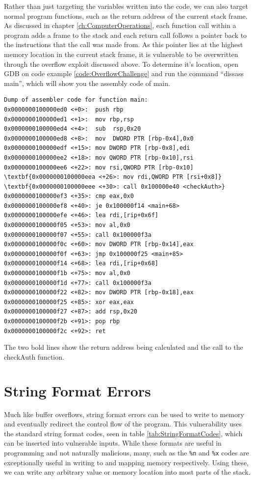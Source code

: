 \documentclass[a4paper,11pt]{report}
\begin{document}
			Rather than just targeting the variables written into the code, we can also target normal program functions,
			such as the return address of the current stack frame. 
			As discussed in chapter \ref{ch:ComputerOperations}, 
			each function call within a program adds a frame to the stack and each return call follows a pointer back to the instructions that the call was made from. 
			As this pointer lies at the highest memory location in the current stack frame, it is vulnerable to be overwritten through the overflow exploit discussed above. 
			To determine it's location, open GDB on code example \ref{code:OverflowChallenge} and run the command ``dissass main'', which will show you the assembly code of main. 
		\begin{Verbatim}[commandchars=\\\{\}]
Dump of assembler code for function main:
0x0000000100000ed0 <+0>:  push rbp
0x0000000100000ed1 <+1>:  mov rbp,rsp
0x0000000100000ed4 <+4>:  sub  rsp,0x20
0x0000000100000ed8 <+8>:  mov  DWORD PTR [rbp-0x4],0x0
0x0000000100000edf <+15>: mov DWORD PTR [rbp-0x8],edi
0x0000000100000ee2 <+18>: mov QWORD PTR [rbp-0x10],rsi
0x0000000100000ee6 <+22>: mov rsi,QWORD PTR [rbp-0x10]
\textbf{0x0000000100000eea <+26>: mov rdi,QWORD PTR [rsi+0x8]}
\textbf{0x0000000100000eee <+30>: call 0x100000e40 <checkAuth>}
0x0000000100000ef3 <+35>: cmp eax,0x0
0x0000000100000ef8 <+40>: je 0x100000f14 <main+68>
0x0000000100000efe <+46>: lea rdi,[rip+0x6f]        
0x0000000100000f05 <+53>: mov al,0x0
0x0000000100000f07 <+55>: call 0x100000f3a
0x0000000100000f0c <+60>: mov DWORD PTR [rbp-0x14],eax
0x0000000100000f0f <+63>: jmp 0x100000f25 <main+85>
0x0000000100000f14 <+68>: lea rdi,[rip+0x68]        
0x0000000100000f1b <+75>: mov al,0x0
0x0000000100000f1d <+77>: call 0x100000f3a
0x0000000100000f22 <+82>: mov DWORD PTR [rbp-0x18],eax
0x0000000100000f25 <+85>: xor eax,eax
0x0000000100000f27 <+87>: add rsp,0x20
0x0000000100000f2b <+91>: pop rbp
0x0000000100000f2c <+92>: ret
		\end{Verbatim}
		The two bold lines show the return address being calculated and the call to the checkAuth function. %

		
	\section{String Format Errors}
		Much like buffer overflows, string format errors can be used to write to memory and eventually redirect the control flow of the program. 
		This vulnerability uses the standard string format codes, seen in table \ref{tab:StringFormatCodes}, which can be inserted into vulnerable inputs. 
		While these formats are useful in programming and not naturally malicious, many, such as the \verb+%n+ and \verb+%x+ codes are exceptionally useful in writing to and mapping memory respectively. 
		Using these, we can write any arbitrary value or memory location into most parts of the stack.
		
\end{document}
